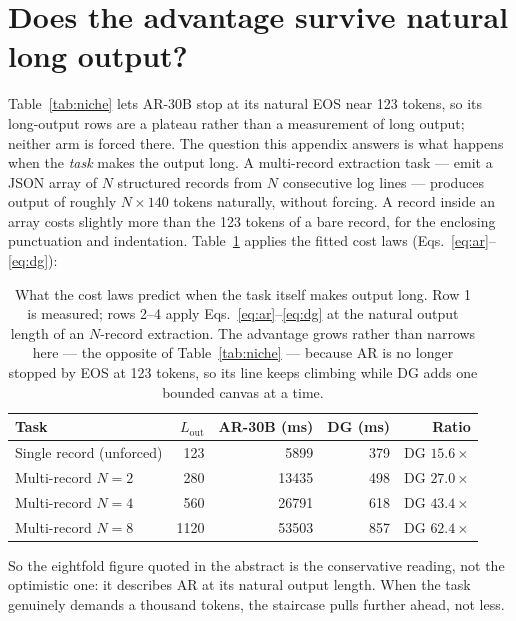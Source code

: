 \section{Does the advantage survive natural long output?}
\label{app:forced}

Table~\ref{tab:niche} lets AR-30B stop at its natural EOS near 123
tokens, so its long-output rows are a plateau rather than a
measurement of long output; neither arm is forced there. The question
this appendix answers is what happens when the \emph{task} makes the
output long. A multi-record extraction task --- emit a JSON array of
$N$ structured records from $N$ consecutive log lines --- produces
output of roughly $N \times 140$ tokens naturally, without forcing.
A record inside an array costs slightly more than the 123 tokens of a
bare record, for the enclosing punctuation and indentation.
Table~\ref{tab:forced} applies the fitted cost laws
(Eqs.~\ref{eq:ar}--\ref{eq:dg}):

\begin{table}[ht!]
\centering
\caption{What the cost laws predict when the task itself makes output
long. Row 1 is measured; rows 2--4 apply Eqs.~\ref{eq:ar}--\ref{eq:dg}
at the natural output length of an $N$-record extraction. The
advantage grows rather than narrows here --- the opposite of
Table~\ref{tab:niche} --- because AR is no longer stopped by EOS at
123 tokens, so its line keeps climbing while DG adds one bounded
canvas at a time.}
\label{tab:forced}
\begin{tabular}{@{}lrrrr@{}}
\toprule
Task & $L_{\mathrm{out}}$ & AR-30B (ms) & DG (ms) & Ratio \\
\midrule
Single record (unforced) & 123 & 5899 & 379 & DG $15.6\times$ \\
Multi-record $N{=}2$ & 280 & 13435 & 498 & DG $27.0\times$ \\
Multi-record $N{=}4$ & 560 & 26791 & 618 & DG $43.4\times$ \\
Multi-record $N{=}8$ & 1120 & 53503 & 857 & DG $62.4\times$ \\
\bottomrule
\end{tabular}
\end{table}

So the eightfold figure quoted in the abstract is the conservative
reading, not the optimistic one: it describes AR at its natural output
length. When the task genuinely demands a thousand tokens, the
staircase pulls further ahead, not less.
